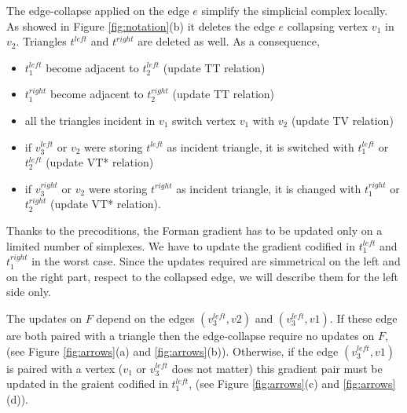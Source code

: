 \documentclass[preprint,5p,times,onecolumn]{article}
\begin{document}
The edge-collapse applied on the edge $e$ simplify the simplicial complex locally. As showed in Figure \ref{fig:notation}(b) it deletes the edge $e$ collapsing vertex $v_1$ in $v_2$. Triangles $t^{left}$ and $t^{right}$ are deleted as well. As a consequence, 

\begin{itemize}
	\item $t_1^{left}$ become adjacent to $t_2^{left}$ (update TT relation)
	\item $t_1^{right}$ become adjacent to $t_2^{right}$ (update TT relation)
	\item all the triangles incident in $v_1$ switch vertex $v_1$ with $v_2$ (update TV relation)
	\item if $v_3^{left}$ or $v_2$ were storing $t^{left}$ as incident triangle, it is switched with $t_1^{left}$ or $t_2^{left}$ (update VT* relation)
	\item if $v_3^{right}$ or $v_2$ were storing $t^{right}$ as incident triangle, it is changed with $t_1^{right}$ or $t_2^{right}$ (update VT* relation).
\end{itemize}

Thanks to the precoditions, the Forman gradient has to be updated only on a limited number of simplexes. We have to update the gradient codified in $t_1^{left}$ and $t_1^{right}$ in the worst case. Since the updates required are simmetrical on the left and on the right part, respect to the collapsed edge, we will describe them for the left side only.

The updates on $F$ depend on the edges $(v_3^{left},v2)$ and $(v_3^{left},v1)$. If these edge are both paired with a triangle then the edge-collapse require no updates on $F$, (see Figure \ref{fig:arrows}(a) and \ref{fig:arrows}(b)). Otherwise, if the edge $(v_3^{left},v1)$ is paired with a vertex ($v_1$ or $v_3^{left}$ does not matter) this gradient pair must be updated in the graient codified in $t_1^{left}$, (see Figure \ref{fig:arrows}(c) and \ref{fig:arrows}(d)).
\end{document}
